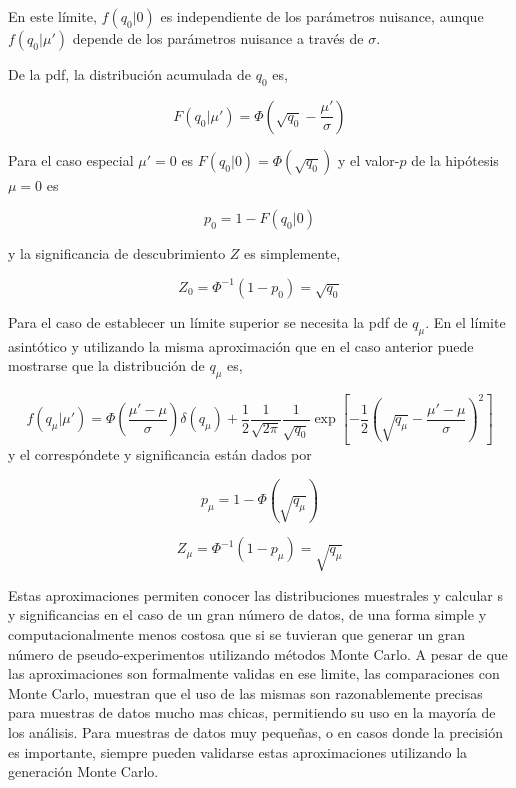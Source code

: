 En este límite, $f(q_0|0)$ es independiente de los parámetros
nuisance, aunque $f(q_0|\mu')$ depende de los parámetros nuisance a través de
$\sigma$.

De la pdf, la distribución acumulada de $q_0$ es,

\begin{equation}
  F(q_0|\mu') = \Phi \left( \sqrt{q_0} - \frac{\mu'}{\sigma} \right)
\end{equation}

Para el caso especial $\mu' = 0$ es $F(q_0|0) = \Phi(\sqrt{q_0})$ y el valor-$p$
de la hipótesis $\mu=0$ es

\begin{equation}
  p_0 = 1 - F(q_0|0)
\end{equation}

y la significancia de descubrimiento $Z$ es simplemente,

\begin{equation}
  Z_0 = \Phi^{-1} (1-p_0) = \sqrt{q_0}
\end{equation}

Para el caso de establecer un límite superior se necesita la pdf de $q_\mu$. En el
límite asintótico y utilizando la misma aproximación que en el caso anterior puede
mostrarse que la distribución de $q_\mu$ es,

\begin{equation}
  f(q_\mu|\mu') = \Phi\left(\frac{\mu'-\mu}{\sigma}\right) \delta(q_\mu) +
  \frac{1}{2}\frac{1}{\sqrt{2\pi}}\frac{1}{\sqrt{q_0}} \exp \left[ -\frac{1}{2}
    \left( \sqrt{q_\mu} - \frac{\mu'-\mu}{\sigma} \right)^2\right]
\end{equation}
%
y el correspóndete {\pvalue} y significancia están dados por

\begin{equation}
  p_\mu = 1 - \Phi(\sqrt{q_\mu})
\end{equation}

\begin{equation}
  Z_\mu = \Phi^{-1}(1-p_\mu) = \sqrt{q_\mu}
\end{equation}

Estas aproximaciones permiten conocer las distribuciones muestrales y calcular
{\pvalue}s y significancias en el caso de un gran número de datos, de una forma
simple y computacionalmente menos costosa que si se tuvieran que generar un gran
número de pseudo-experimentos utilizando métodos Monte Carlo. A pesar de que las
aproximaciones son formalmente validas en ese limite, las comparaciones con
Monte Carlo, muestran que el uso de las mismas son razonablemente precisas para
muestras de datos mucho mas chicas, permitiendo su uso en la mayoría de los
análisis. Para muestras de datos muy pequeñas, o en casos donde la precisión es
importante, siempre pueden validarse estas aproximaciones utilizando la
generación Monte Carlo.


